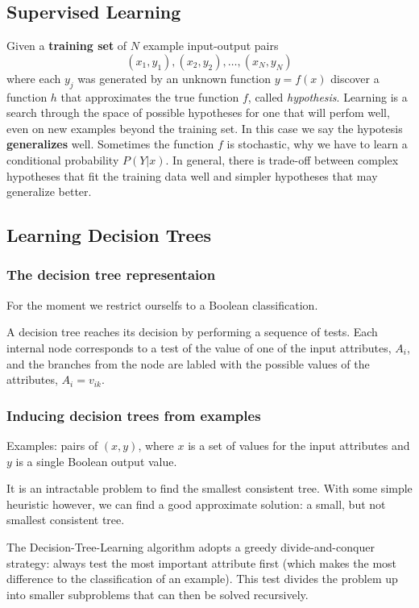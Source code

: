 \documentclass{scrartcl}
\begin{document}
\subsection{Supervised Learning}
Given a \textbf{training set} of \(N\) example input-output pairs
\[(x_1, y_1), (x_2, y_2), \dots, (x_N, y_N)\]
where each \(y_j\) was generated by an unknown function \(y = f(x)\) discover a function \(h\) that approximates the true function \(f\), called \textit{hypothesis}. Learning is a search through the space of possible hypotheses for one that will perfom well, even on new examples beyond the training set. In this case we say the hypotesis \textbf{generalizes} well. Sometimes the function \(f\) is stochastic, why we have to learn a conditional probability \(P(Y|x)\). In general, there is trade-off between complex hypotheses that fit the training data well and simpler hypotheses that may generalize better.

\subsection{Learning Decision Trees}
\subsubsection{The decision tree representaion}
For the moment we restrict ourselfs to a Boolean classification.

A decision tree reaches its decision by performing a sequence of tests. Each internal node corresponds to a test of the value of one of the input attributes, \(A_i\), and the branches from the node are labled with the possible values of the attributes, \(A_i = v_{ik}\).

\subsubsection{Inducing decision trees from examples}
Examples: pairs of \((x,y)\), where \(x\) is a set of values for the input attributes and \(y\) is a single Boolean output value.

It is an intractable problem to find the smallest consistent tree. With some simple heuristic however, we can find a good approximate solution: a small, but not smallest consistent tree.

The Decision-Tree-Learning algorithm adopts a greedy divide-and-conquer strategy: always test the most important attribute first (which makes the most difference to the classification of an example). This test divides the problem up into smaller subproblems that can then be solved recursively.
\end{document}
